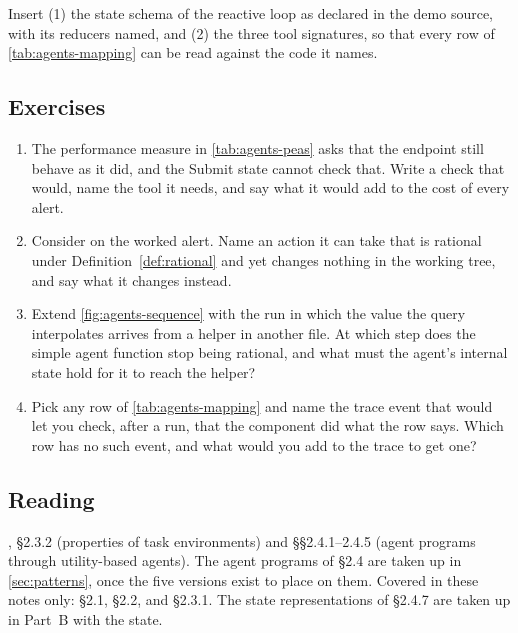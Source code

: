 \begin{demostub}
Insert (1) the state schema of the reactive loop as declared in the demo source, with its
reducers named, and
(2) the three tool signatures, so that every row of \cref{tab:agents-mapping} can be read against
the code it names.
\end{demostub}

\subsection{Exercises}

\begin{enumerate}
  \item The performance measure in \cref{tab:agents-peas} asks that the endpoint still behave as
  it did, and the Submit state cannot check that. Write a check that would, name the tool it
  needs, and say what it would add to the cost of every alert.
  \item Consider \msa{} on the worked alert. Name an action it can take that is rational under
  Definition~\ref{def:rational} and yet changes nothing in the working tree, and say what it
  changes instead.
  \item Extend \cref{fig:agents-sequence} with the run in which the value the query interpolates
  arrives from a helper in another file. At which step does the simple agent function stop being
  rational, and what must the agent's internal state hold for it to reach the helper?
  \item Pick any row of \cref{tab:agents-mapping} and name the trace event that would let you
  check, after a run, that the component did what the row says. Which row has no such event, and
  what would you add to the trace to get one?
\end{enumerate}

\subsection{Reading}

\citet{russell2020aima}, \S2.3.2 (properties of task environments) and
\S\S2.4.1--2.4.5 (agent programs through utility-based agents). The agent programs of \S2.4 are
taken up in \cref{sec:patterns}, once the five versions exist to place on them.
Covered in these notes only: \S2.1, \S2.2, and \S2.3.1. The state representations of \S2.4.7 are
taken up in Part~B with the state.

